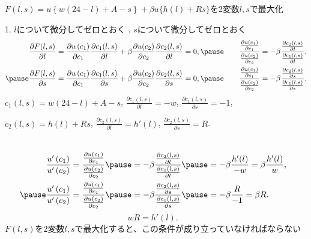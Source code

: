 \begin{frame}[t]{}
$F(l, s)=u\left\{w(24-l)+A-s\right\}+\beta u\{h(l)+Rs\}$を2変数$l, s$で最大化

\pause
{\scriptsize 1. $l$について微分してゼロとおく . $s$について微分してゼロとおく}
\[
\begin{aligned}
\frac{\partial F(l, s)}{\partial l}
&=
\frac{\partial u\left(c_{1}\right)}{\partial c_{1}}\frac{\partial c_{1}(l, s)}{\partial l}
+\beta \frac{\partial u(c_{2})}{\partial c_{2}}\frac{\partial c_{2}(l, s)}{\partial l}=0, 
\pause
\quad 
&\frac{\frac{\partial u\left(c_{1}\right)}{\partial c_{1}}}{\frac{\partial u\left(c_{2}\right)}{\partial c_{2}}}
&=
-\beta \frac{\frac{\partial c_{2}(l, s)}{\partial l}}{\frac{\partial c_{1}(l, s)}{\partial l}},\\
\pause
\frac{\partial F(l, s)}{\partial s}
&=
\frac{\partial u\left(c_{1}\right)}{\partial c_{1}}\frac{\partial c_{1}(l, s)}{\partial s}
+\beta \frac{\partial u(c_{2})}{\partial c_{2}}\frac{\partial c_{2}(l, s)}{\partial s}=0, 
\pause
\quad
&\frac{\frac{\partial u\left(c_{1}\right)}{\partial c_{1}}}{\frac{\partial u\left(c_{2}\right)}{\partial c_{2}}}
&=
-\beta \frac{\frac{\partial c_{2}(l, s)}{\partial s}}{\frac{\partial c_{1}(l, s)}{\partial s}}.
\end{aligned}
\]
\pause
$c_{1}(l, s)=w(24-l)+A-s$\pause, $\frac{\partial c_{1}(l, s)}{\partial l}=-w$, $\frac{\partial c_{1}(l, s)}{\partial s}=-1$, 

\pause
$c_{2}(l, s)=h(l)+Rs$\pause, $\frac{\partial c_{2}(l, s)}{\partial l}=h'(l)$, $\frac{\partial c_{2}(l, s)}{\partial s}=R$.
\begin{columns}[T]
\pause
\[
\begin{aligned}
\frac{u'\left(c_{1}\right)}{u'\left(c_{2}\right)}&=
\frac{\frac{\partial u\left(c_{1}\right)}{\partial c_{1}}}{\frac{\partial u\left(c_{2}\right)}{\partial c_{2}}}
\pause
=
-\beta \frac{\frac{\partial c_{2}(l, s)}{\partial l}}{\frac{\partial c_{1}(l, s)}{\partial l}}
\pause
=-\beta\frac{h'(l)}{-w}=\beta\frac{h'(l)}{w},\\
\pause
\frac{u'\left(c_{1}\right)}{u'\left(c_{2}\right)}&=
\frac{\frac{\partial u\left(c_{1}\right)}{\partial c_{1}}}{\frac{\partial u\left(c_{2}\right)}{\partial c_{2}}}
\pause
=
-\beta \frac{\frac{\partial c_{2}(l, s)}{\partial s}}{\frac{\partial c_{1}(l, s)}{\partial s}}
\pause
=-\beta\frac{R}{-1}=\beta R. 
\end{aligned}
\]
\pause
\[
wR=h'(l).
\]
$F(l, s)$を2変数$l, s$で最大化すると、この条件が成り立っていなければならない
\end{columns}
\end{frame}

